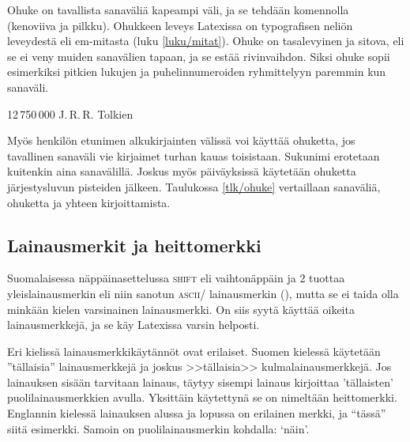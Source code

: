 Ohuke on tavallista sanaväliä kapeampi väli, ja se tehdään
komennolla~\komentom{,} (kenoviiva ja pilkku). Ohukkeen leveys Latexissa
on  typografisen neliön leveydestä eli em-mitasta (luku
\ref{luku/mitat}). Ohuke on tasalevyinen ja sitova, eli se ei veny
muiden sanavälien tapaan, ja se estää rivinvaihdon. Siksi ohuke sopii
esimerkiksi pitkien lukujen ja puhelinnumeroiden ryhmittelyyn paremmin
kun sanaväli.

\komentoi{,}
\begin{koodilohkosis}
12\,750\,000
J.\,R.\,R. Tolkien
\end{koodilohkosis}

\noindent
Myös henkilön etunimen alkukirjainten välissä voi käyttää ohuketta, jos
tavallinen sanaväli vie kirjaimet turhan kauas toisistaan. Sukunimi
erotetaan kuitenkin aina sanavälillä. Joskus myös päiväyksissä käytetään
ohuketta järjestysluvun pisteiden jälkeen. Taulukossa \ref{tlk/ohuke}
vertaillaan sanaväliä, ohuketta ja yhteen kirjoittamista.


\subsection{Lainausmerkit ja heittomerkki}
\label{luku/lainausmerkit}

Suomalaisessa näppäinasettelussa \textsc{shift} eli vaihtonäppäin ja 2
tuottaa yleislainausmerkin eli niin sanotun \textsc{ascii}\-/
lainausmerkin (\textquotedbl), mutta se ei taida olla minkään kielen
varsinainen lainausmerkki. On siis syytä käyttää oikeita
lainausmerkkejä, ja se käy Latexissa varsin helposti.

Eri kielissä lainausmerkkikäytännöt ovat erilaiset. Suomen kielessä
käytetään ''tällaisia'' lainausmerkkejä ja joskus >>tällaisia>>
kulmalainausmerkkejä. Jos lainauksen sisään tarvitaan lainaus, täytyy
sisempi lainaus kirjoittaa 'tällaisten' puolilainausmerkkien avulla.
Yksittäin käytettynä se on nimeltään heittomerkki. Englannin kielessä
lainauksen alussa ja lopussa on erilainen merkki, ja ``tässä'' siitä
esimerkki. Samoin on puolilainausmerkin kohdalla: `näin'.


